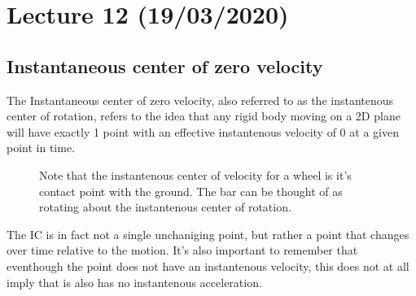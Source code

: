 \documentclass[11pt, a4paper]{article}
\begin{document}
\setcounter{section}{11}
\section{Lecture 12 (19/03/2020)}
\subsection{Instantaneous center of zero velocity}
The Instantaneous center of zero velocity, also referred to as the instantenous center of rotation, refers to the idea that any rigid body moving on a 2D plane will have exactly 1 point with an effective instantenous velocity of 0 at a given point in time.
\begin{figure}[h]
  \centering
  \qquad
  \caption{Note that the instantenous center of velocity for a wheel is it's contact point with the ground. The bar can be thought of as rotating about the instantenous center of rotation.}
\end{figure}
The IC is in fact not a single unchaniging point, but rather a point that changes over time relative to the motion. It's also important to remember that eventhough the point does not have an instantenous velocity, this does not at all imply that is also has no instantenous acceleration.
\end{document}
